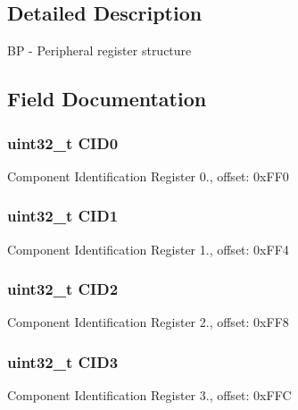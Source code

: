 \subsection{Detailed Description}
B\+P -\/ Peripheral register structure 

\subsection{Field Documentation}
\hypertarget{struct_b_p___mem_map_a46667149a1f5fa643ce1b5e7d55d85fb}{}
\subsubsection[{C\+I\+D0}]{\setlength{\rightskip}{0pt plus 5cm}uint32\+\_\+t C\+I\+D0}\label{struct_b_p___mem_map_a46667149a1f5fa643ce1b5e7d55d85fb}
Component Identification Register 0., offset\+: 0x\+F\+F0 \hypertarget{struct_b_p___mem_map_afafacc56ceb45f360e2f940ee6b00467}{}
\subsubsection[{C\+I\+D1}]{\setlength{\rightskip}{0pt plus 5cm}uint32\+\_\+t C\+I\+D1}\label{struct_b_p___mem_map_afafacc56ceb45f360e2f940ee6b00467}
Component Identification Register 1., offset\+: 0x\+F\+F4 \hypertarget{struct_b_p___mem_map_a3451ba8427632b30ce7bbaf9e9aa37a4}{}
\subsubsection[{C\+I\+D2}]{\setlength{\rightskip}{0pt plus 5cm}uint32\+\_\+t C\+I\+D2}\label{struct_b_p___mem_map_a3451ba8427632b30ce7bbaf9e9aa37a4}
Component Identification Register 2., offset\+: 0x\+F\+F8 \hypertarget{struct_b_p___mem_map_aea4c61492fd7567bc47e9a5eaf95ca58}{}
\subsubsection[{C\+I\+D3}]{\setlength{\rightskip}{0pt plus 5cm}uint32\+\_\+t C\+I\+D3}\label{struct_b_p___mem_map_aea4c61492fd7567bc47e9a5eaf95ca58}
Component Identification Register 3., offset\+: 0x\+F\+F\+C \hypertarget{struct_b_p___mem_map_afb7d1b290d30b9254c6975be8cfafbd7}{}
